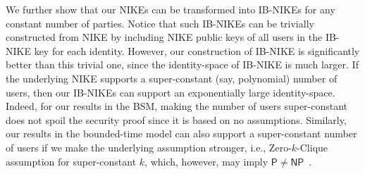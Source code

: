  We further show that our NIKEs can be transformed into IB-NIKEs for any constant number of parties. Notice that such IB-NIKEs can be trivially constructed from NIKE by including NIKE public keys of all users in the IB-NIKE key for each identity. However, our construction of IB-NIKE is significantly better than this trivial one, since the identity-space of IB-NIKE is much larger. 
If the underlying NIKE supports a super-constant (say, polynomial) number of users, then our IB-NIKEs can support an exponentially large identity-space.
Indeed, for our results in the BSM, making the number of users super-constant does not spoil the security proof since it is based on no assumptions. Similarly, our results in the bounded-time model can also support a super-constant number of users if we make the underlying assumption stronger, i.e., Zero-$k$-Clique assumption for super-constant $k$, which, however, may imply $\mathsf P\neq\mathsf{NP}$~\cite{C:LaVLinWil19}.

